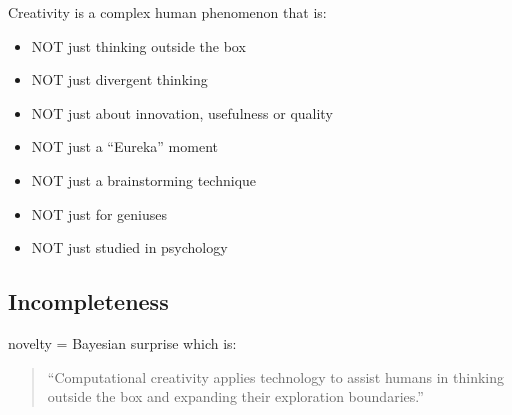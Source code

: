 Creativity is a complex human phenomenon that is:

\begin{itemize}
  \item NOT just thinking outside the box
  \item NOT just divergent thinking
  \item NOT just about innovation, usefulness or quality
  \item NOT just a ``Eureka'' moment
  \item NOT just a brainstorming technique
  \item NOT just for geniuses
  \item NOT just studied in psychology
\end{itemize}



\subsection{Incompleteness}

\autocite{Varshney2013}
novelty = Bayesian surprise \autocite{Baldi2010}
which is:

\begin{quote}
  ``Computational creativity applies technology to assist humans in thinking outside the box and expanding their exploration boundaries.''
\end{quote}

%


